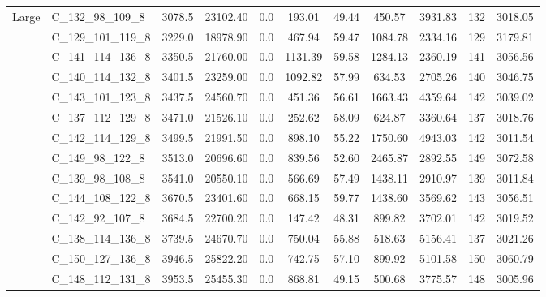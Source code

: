 \documentclass{article}
\begin{document}
\begin{table}[!h]
{\begin{tabular}{llccccccccc}
                  \cmidrule{2-11}
                  \multirow{14}{*}{Large} & C\_132\_98\_109\_8 &         3078.5 &    23102.40 &  0.0 &             193.01 &             49.44 &         450.57 &       3931.83 &         132 &  3018.05 \\
                  & C\_129\_101\_119\_8 &         3229.0 &    18978.90 &  0.0 &             467.94 &             59.47 &        1084.78 &       2334.16 &         129 &  3179.81 \\
                  & C\_141\_114\_136\_8 &         3350.5 &    21760.00 &  0.0 &            1131.39 &             59.58 &        1284.13 &       2360.19 &         141 &  3056.56 \\
                  & C\_140\_114\_132\_8 &         3401.5 &    23259.00 &  0.0 &            1092.82 &             57.99 &         634.53 &       2705.26 &         140 &  3046.75 \\
                  & C\_143\_101\_123\_8 &         3437.5 &    24560.70 &  0.0 &             451.36 &             56.61 &        1663.43 &       4359.64 &         142 &  3039.02 \\
                  & C\_137\_112\_129\_8 &         3471.0 &    21526.10 &  0.0 &             252.62 &             58.09 &         624.87 &       3360.64 &         137 &  3018.76 \\
                  & C\_142\_114\_129\_8 &         3499.5 &    21991.50 &  0.0 &             898.10 &             55.22 &        1750.60 &       4943.03 &         142 &  3011.54 \\
                  & C\_149\_98\_122\_8 &         3513.0 &    20696.60 &  0.0 &             839.56 &             52.60 &        2465.87 &       2892.55 &         149 &  3072.58 \\
                  & C\_139\_98\_108\_8 &         3541.0 &    20550.10 &  0.0 &             566.69 &             57.49 &        1438.11 &       2910.97 &         139 &  3011.84 \\
                  & C\_144\_108\_122\_8 &         3670.5 &    23401.60 &  0.0 &             668.15 &             59.77 &        1438.60 &       3569.62 &         143 &  3056.51 \\
                  & C\_142\_92\_107\_8 &         3684.5 &    22700.20 &  0.0 &             147.42 &             48.31 &         899.82 &       3702.01 &         142 &  3019.52 \\
                  & C\_138\_114\_136\_8 &         3739.5 &    24670.70 &  0.0 &             750.04 &             55.88 &         518.63 &       5156.41 &         137 &  3021.26 \\
                  & C\_150\_127\_136\_8 &         3946.5 &    25822.20 &  0.0 &             742.75 &             57.10 &         899.92 &       5101.58 &         150 &  3060.79 \\
                  & C\_148\_112\_131\_8 &         3953.5 &    25455.30 &  0.0 &             868.81 &             49.15 &         500.68 &       3775.57 &         148 &  3005.96 \\
            \bottomrule
            \end{tabular}
    }
\end{table}
\fi
\end{document}
